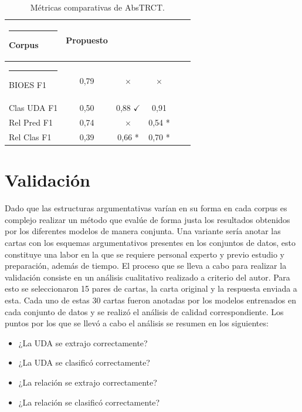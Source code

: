 \documentclass[a4paper,11pt,twocolumn,twoside]{article}
\begin{document}
\begin{table}[h]
	\begin{center}
		\begin{tabular}{|l|c|c|c|c|c|} 
			\hline\rule{-2pt}{15pt}
			{\bf Corpus}      & {\bf Propuesto} & {\bf \cite{mayer2020transformer}} & {\bf \cite{galassi2021deep}} \\ 
			\hline\rule{-4pt}{10pt}
			BIOES F1    & 0,79      & $\times$                    & $\times$               \\
			Clas UDA F1 & 0,50      & 0,88	$\checkmark$            & 0,91                   \\
			Rel Pred F1 & 0,74      & $\times$                    & 0,54 *                 \\
			Rel Clas F1 & 0,39      & 0,66  *                     & 0,70 *                 \\ 
			\hline
		\end{tabular}
		\caption{\label{table:comparative_test_abstrct_f1_metrics_segmenter}Métricas comparativas de AbsTRCT.}
	\end{center}
\end{table}

\section{Validación}

Dado que las estructuras argumentativas varían en su forma en cada corpus es complejo realizar un método que evalúe de forma 
justa los resultados obtenidos por los diferentes modelos de manera conjunta. Una variante sería anotar las cartas 
con los esquemas argumentativos presentes en los conjuntos de datos, esto constituye una labor en la que se requiere
personal experto y previo estudio y preparación, además de tiempo. El proceso que se lleva a cabo para realizar la 
validación consiste en un análisis cualitativo realizado a criterio del autor. Para esto se seleccionaron 15 pares 
de cartas, la carta original y la respuesta enviada a esta. Cada uno de estas 30 cartas fueron anotadas por los modelos entrenados en cada 
conjunto de datos y se realizó el análisis de calidad correspondiente. Los puntos por los que se llevó a cabo el análisis
se resumen en los siguientes:

\begin{itemize}
	\item ¿La UDA se extrajo correctamente?
	\item ¿La UDA se clasificó correctamente?
	\item ¿La relación se extrajo correctamente?
	\item ¿La relación se clasificó correctamente?
\end{itemize}
\end{document}

